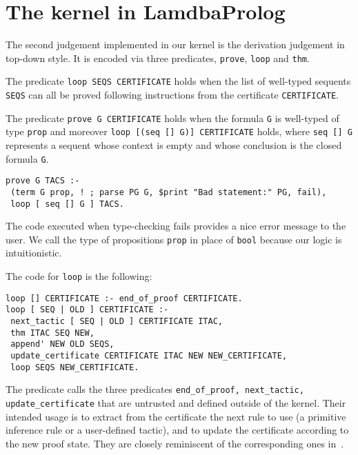\documentclass[preprint]{sigplanconf}
\begin{document}
% 
% 

\section{The kernel in LamdbaProlog}
The second judgement implemented in our kernel is the derivation judgement in top-down style. It is encoded via three predicates, \verb+prove+, \verb+loop+ and \verb+thm+.

The predicate \verb+loop SEQS CERTIFICATE+ holds when the list of well-typed sequents \verb+SEQS+ can all be proved following instructions from the certificate \verb+CERTIFICATE+.

The predicate \verb+prove G CERTIFICATE+ holds when the formula \verb+G+ is well-typed of type \verb+prop+ and moreover \verb+loop [(seq [] G)] CERTIFICATE+ holds, where \verb+seq [] G+ represents a sequent whose context is empty and whose conclusion is the closed formula \verb+G+.
\begin{small}
\begin{verbatim}
prove G TACS :-
 (term G prop, ! ; parse PG G, $print "Bad statement:" PG, fail),
 loop [ seq [] G ] TACS.
\end{verbatim}
\end{small}
The code executed when type-checking fails provides a nice error message to the user. We call the type of propositions \verb+prop+ in place of \verb+bool+ because our logic is intuitionistic.

The code for \verb+loop+ is the following:
\begin{small}
\begin{verbatim}
loop [] CERTIFICATE :- end_of_proof CERTIFICATE.
loop [ SEQ | OLD ] CERTIFICATE :-
 next_tactic [ SEQ | OLD ] CERTIFICATE ITAC,
 thm ITAC SEQ NEW,
 append' NEW OLD SEQS,
 update_certificate CERTIFICATE ITAC NEW NEW_CERTIFICATE,
 loop SEQS NEW_CERTIFICATE.
\end{verbatim}
\end{small}
The predicate calls the three predicates \verb+end_of_proof, next_tactic, update_certificate+ that are untrusted and defined outside of the kernel. Their intended usage is to extract from the certificate the next rule to use (a primitive inference rule or a user-defined tactic), and to update the certificate according to the new proof state. They are closely reminiscent of the corresponding ones in~\cite{miller????}.
\end{document}
